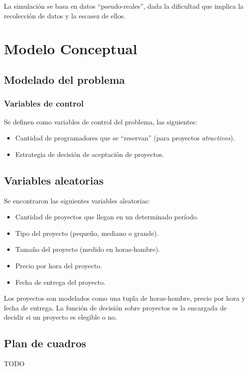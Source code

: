 \documentclass[a4paper,10pt]{article}
\begin{document}
La simulación se basa en datos ``pseudo-reales'', dada la dificultad que implica la recolección de datos y la escasez de ellos.\\

\section{Modelo Conceptual}

\subsection{Modelado del problema}

\subsubsection{Variables de control}
Se definen como variables de control del problema, las siguientes:

\begin{itemize}
    \item Cantidad de programadores que se ``reservan'' (para proyectos \textit{atractivos}).
    \item Estrategia de decisión de aceptación de proyectos.
\end{itemize}

\subsection{Variables aleatorias}
Se encontraron las siguientes variables aleatorias:

\begin{itemize}
    \item Cantidad de proyectos que llegan en un determinado período.
    \item Tipo del proyecto (pequeño, mediano o grande).
    \item Tamaño del proyecto (medido en horas-hombre).
    \item Precio por hora del proyecto.
    \item Fecha de entrega del proyecto.    
\end{itemize}

Los proyectos son modelados como una tupla de horas-hombre, precio por hora y fecha de entrega. La función de decisión sobre proyectos es la encargada de decidir 
si un proyecto es elegible o no.

\subsection{Plan de cuadros}
TODO
\end{document}
